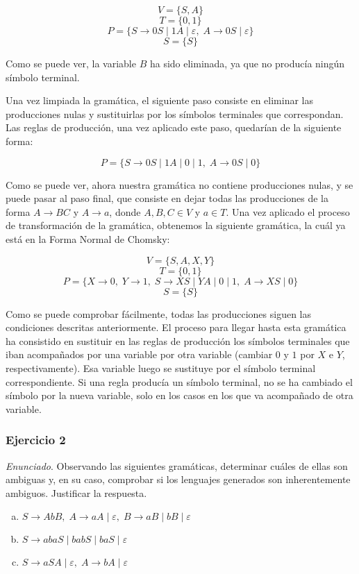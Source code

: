 \documentclass[11pt,a4paper]{article}
\newcommand{\enu}{\textit{Enunciado}}
\begin{document}
		\[V = \{S, A\}\]
		\[T = \{0, 1\}\]
		\[P = \{S \rightarrow 0S \; | \; 1A \; | \; \varepsilon, \; A \rightarrow 0S \; | \; \varepsilon\} \]
		\[S = \{ S \} \]	
		
		Como se puede ver, la variable $B$ ha sido eliminada, ya que no producía ningún símbolo terminal. \par
		
		Una vez limpiada la gramática, el siguiente paso consiste en eliminar las producciones nulas y sustituirlas por
		los símbolos terminales que correspondan. Las reglas de producción, una vez aplicado este paso, quedarían de la
		siguiente forma:
		
		\[P = \{S \rightarrow 0S \; | \; 1A \; | \; 0 \; | \; 1, \; A \rightarrow 0S \; | \; 0\} \]
		
		Como se puede ver, ahora nuestra gramática no contiene producciones nulas, y se puede pasar al paso final, que
		consiste en dejar todas las producciones de la forma $A \rightarrow BC$ y $A \rightarrow a$, donde $A, B, C \in V$
		y $a \in T$. Una vez aplicado el proceso de transformación de la gramática, obtenemos la siguiente gramática, la
		cuál ya está en la Forma Normal de Chomsky:
		
		\[V = \{S, A, X, Y\}\]
		\[T = \{0, 1\}\]
		\[P = \{X \rightarrow 0, \; Y \rightarrow 1, \; S \rightarrow XS \; | \; YA \; | \; 0 \; | \; 1, \;
				A \rightarrow XS \; | \; 0\} \]
		\[S = \{ S \} \]
		
		Como se puede comprobar fácilmente, todas las producciones siguen las condiciones descritas anteriormente. El proceso
		para llegar hasta esta gramática ha consistido en sustituir en las reglas de producción los símbolos terminales que
		iban acompañados por una variable por otra variable (cambiar $0$ y $1$ por $X$ e $Y$, respectivamente). Esa variable
		luego se sustituye por el símbolo terminal correspondiente. Si una regla producía un símbolo terminal, no se ha
		cambiado el símbolo por la nueva variable, solo en los casos en los que va acompañado de otra variable.
		
		\subsubsection{Ejercicio 2}
		\enu. Observando las siguientes gramáticas, determinar cuáles de ellas son ambiguas y, en su caso, comprobar si los
		lenguajes generados son inherentemente ambiguos. Justificar la respuesta.
		
		\begin{enumerate}[a)]
			\item $S \rightarrow AbB, \; A \rightarrow aA \; | \; \varepsilon, \; B \rightarrow aB \; | \; bB \; | \;
			\varepsilon$
			\item $S \rightarrow abaS \; | \; babS  \; | \; baS \; | \; \varepsilon$
			\item $S \rightarrow aSA \; | \; \varepsilon, \; A \rightarrow bA \; | \; \varepsilon$
		\end{enumerate}
		
\end{document}
